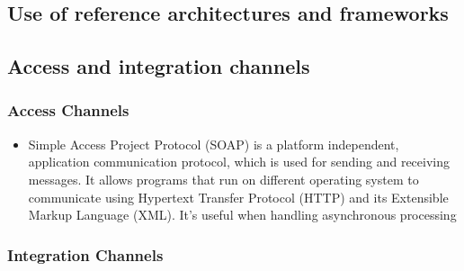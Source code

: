\documentclass[11pt]{article}
\begin{document}
	\subsection{Use of reference architectures and frameworks}
	
	\subsection{Access and integration channels}
	
		\subsubsection{Access Channels}
		
		\begin{itemize}			
			\item Simple Access Project Protocol (SOAP) is a platform independent, application communication protocol, which is used for sending and receiving messages. It allows programs that run on different operating system to communicate using  Hypertext Transfer Protocol (HTTP) and its Extensible Markup Language (XML). It's useful when handling asynchronous processing
		\end{itemize}
	
		\subsubsection{Integration Channels}
		
\end{document}

